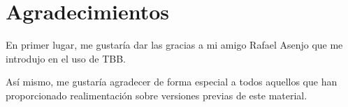 \chapter*{Agradecimientos}

En primer lugar, me gustaría dar las gracias a mi amigo
Rafael Asenjo que me introdujo en el uso de TBB.

Así mismo, me gustaría agradecer de forma especial a todos aquellos
que han proporcionado realimentación sobre versiones previas de este 
material.
